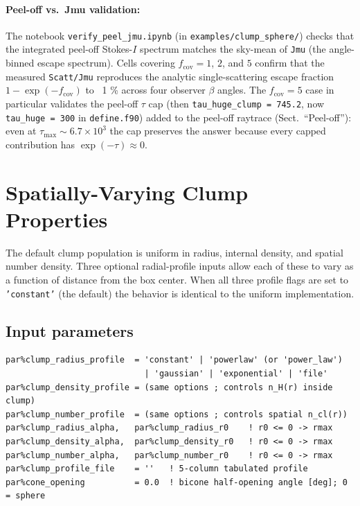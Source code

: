 \documentclass[english,a4paper]{my_memo}
\begin{document}
\begin{sloppypar}
\paragraph{Peel-off vs.\ Jmu validation:}
The notebook \texttt{verify\_peel\_jmu.ipynb}
(in \texttt{examples/clump\_sphere/})
checks that the integrated peel-off Stokes-$I$ spectrum matches the
sky-mean of \texttt{Jmu} (the angle-binned escape spectrum).  Cells
covering $f_\mathrm{cov} = 1$, $2$, and $5$ confirm that the measured
\texttt{Scatt/Jmu} reproduces the analytic single-scattering escape
fraction $1 - \exp(-f_\mathrm{cov})$ to ~1 \% across four observer
$\beta$ angles.  The $f_\mathrm{cov} = 5$ case in particular validates
the peel-off $\tau$ cap (then \texttt{tau\_huge\_clump = 745.2}, now
\texttt{tau\_huge = 300} in \texttt{define.f90}) added to the peel-off
raytrace (Sect.~``Peel-off''): even at $\tau_\mathrm{max} \sim 6.7\times10^3$
the cap preserves the answer because every capped contribution has
$\exp(-\tau) \approx 0$.
\end{sloppypar}

\section{Spatially-Varying Clump Properties}

The default clump population is uniform in radius, internal density, and
spatial number density.  Three optional radial-profile inputs allow each
of these to vary as a function of distance from the box center.  When all
three profile flags are set to \texttt{'constant'} (the default) the
behavior is identical to the uniform implementation.

\subsection{Input parameters}

\begin{lstlisting}
par%clump_radius_profile  = 'constant' | 'powerlaw' (or 'power_law')
                            | 'gaussian' | 'exponential' | 'file'
par%clump_density_profile = (same options ; controls n_H(r) inside clump)
par%clump_number_profile  = (same options ; controls spatial n_cl(r))
par%clump_radius_alpha,   par%clump_radius_r0    ! r0 <= 0 -> rmax
par%clump_density_alpha,  par%clump_density_r0   ! r0 <= 0 -> rmax
par%clump_number_alpha,   par%clump_number_r0    ! r0 <= 0 -> rmax
par%clump_profile_file    = ''   ! 5-column tabulated profile
par%cone_opening          = 0.0  ! bicone half-opening angle [deg]; 0 = sphere
\end{lstlisting}
\end{document}
